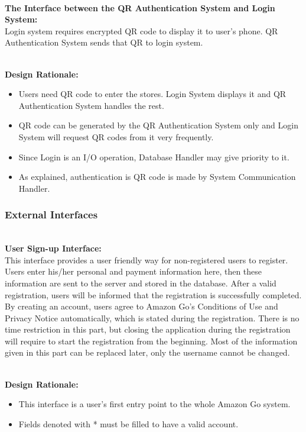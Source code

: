\documentclass[11pt]{article}
\newcounter{subsubsubsection}[subsubsection]
\begin{document}
    \textbf{\\The Interface between the QR Authentication System and Login System:\\}
    Login system requires encrypted QR code to display it to user's phone. QR Authentication System sends that QR to login system.
    
    \textbf{\\Design Rationale:}
    \begin{itemize}
       \item Users need QR code to enter the stores. Login System displays it and QR Authentication System handles the rest.
       \item QR code can be generated by the QR Authentication System only and Login System will request QR codes from it very frequently.
       \item Since Login is an I/O operation, Database Handler may give priority to it.
       \item As explained, authentication is QR code is made by System Communication Handler.
    \end{itemize}
    
    \subsubsection{External Interfaces}
    
    \textbf{\\User Sign-up Interface:\\}
    This interface provides a user friendly way for non-registered users to register. Users enter his/her personal and payment information
    here, then these information are sent to the server and stored in the database.
    After a valid registration, users will be informed that the registration is successfully
    completed. By creating an account, users agree to Amazon Go's Conditions of Use
    and Privacy Notice automatically, which is stated during the registration. There is
    no time restriction in this part, but closing the application during the registration
    will require to start the registration from the beginning. Most of the information
    given in this part can be replaced later, only the username cannot be changed.
    
    \textbf{\\Design Rationale:}
    \begin{itemize}
       \item This interface is a user's first entry point to the whole Amazon Go system. 
       \item Fields denoted with * must be filled to have a valid account.
    \end{itemize}
\end{document}
